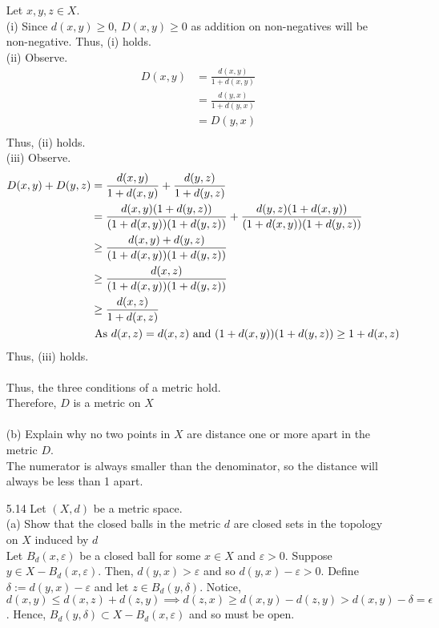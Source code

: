 \documentclass[12pt]{article}
\newcommand{\1}{^{-1}}
\begin{document}
\begin{enumerate}
	Let $ x,y,z\in X $.
	\\
	(i) Since $ d(x,y)\geq 0 $,  $ D(x,y) \geq 0 $ as addition on non-negatives will be non-negative. 
	Thus, (i) holds.\\
	
	(ii) Observe. 
	\begin{align*}
		D(x,y) &= \frac{d(x,y)}{1+d(x,y)}\\
		       &= \frac{d(y,x)}{1+d(y,x)}\\
		       &= D(y,x)\\
	\end{align*}
	Thus, (ii) holds.\\
	(iii)
	Observe.
	\begin{align*}
	    	D(x,y)+D(y,z)&= \frac{d(x,y)}{1+d(x,y)} + \frac{d(y,z)}{1+d(y,z)} \\
						 &= \frac{d(x,y)(1+d(y,z))}{(1+d(x,y))(1+d(y,z))} + \frac{d(y,z)(1+d(x,y))}{(1+d(x,y))(1+d(y,z))}\\
						 &\geq \frac{d(x,y)+d(y,z)}{(1+d(x,y))(1+d(y,z))}\\
						 &\geq \frac{d(x,z)}{(1+d(x,y))(1+d(y,z))}\\
						 &\geq \frac{d(x,z)}{1+d(x,z)} \\
						 &\text{ As $ d(x,z)=d(x,z)  $ and $ (1+d(x,y))(1+d(y,z)) \geq 1+d(x,z)$ }
	\end{align*}
	Thus, (iii) holds.\\
	\\
	Thus, the three conditions of a metric hold.\\
	Therefore, $ D $ is a metric on $ X $\\
	\\
	(b) Explain why no two points in $X$ are distance one or more apart in the metric $D$.\\
	The numerator is always smaller than the denominator, so the distance will always be less than 1 apart.
	\item[5.14] Let $(X, d)$ be a metric space.\\
	(a) Show that the closed balls in the metric $d$ are closed sets in the topology on $X$ induced by $d$\\
	Let $ B_d(x, \varepsilon) $ be a closed ball for some $ x\in X $ and $ \varepsilon > 0 $. Suppose $ y\in X-B_d(x,\varepsilon) $. Then,  $ d(y,x) > \varepsilon $ and so $ d(y,x)-\varepsilon > 0 $. Define $ \delta := d(y,x)-\varepsilon $ and let $ z\in B_d(y,\delta) $. Notice, $ d(x,y)\leq d(x,z)+d(z,y) \implies d(z,x) \geq d(x,y)-d(z,y)>d(x,y)-\delta = \epsilon $. Hence, $ B_d(y,\delta) \subset X-B_d(x,\varepsilon) $ and so must be open. \\

\end{enumerate}
\end{document}
